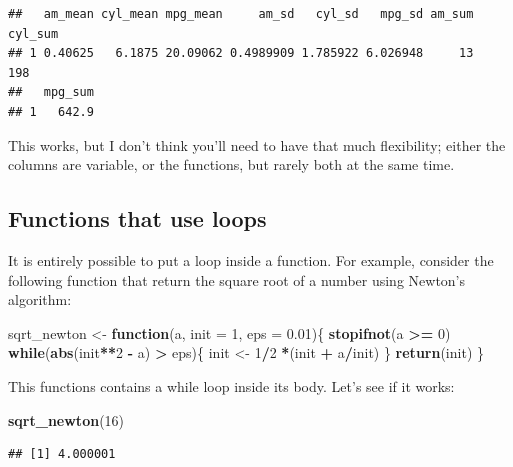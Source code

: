 \documentclass[]{gitbook}
\newenvironment{Shaded}{\begin{snugshade}}{\end{snugshade}}
\newcommand{\ControlFlowTok}[1]{\textcolor[rgb]{0.13,0.29,0.53}{\textbf{#1}}}
\newcommand{\DataTypeTok}[1]{\textcolor[rgb]{0.13,0.29,0.53}{#1}}
\newcommand{\DecValTok}[1]{\textcolor[rgb]{0.00,0.00,0.81}{#1}}
\newcommand{\FloatTok}[1]{\textcolor[rgb]{0.00,0.00,0.81}{#1}}
\newcommand{\KeywordTok}[1]{\textcolor[rgb]{0.13,0.29,0.53}{\textbf{#1}}}
\newcommand{\NormalTok}[1]{#1}
\newcommand{\OperatorTok}[1]{\textcolor[rgb]{0.81,0.36,0.00}{\textbf{#1}}}
\newcommand{\StringTok}[1]{\textcolor[rgb]{0.31,0.60,0.02}{#1}}
\theoremstyle{definition}
\theoremstyle{definition}
\theoremstyle{definition}
\theoremstyle{remark}
\begin{document}
\begin{verbatim}
##   am_mean cyl_mean mpg_mean     am_sd   cyl_sd   mpg_sd am_sum cyl_sum
## 1 0.40625   6.1875 20.09062 0.4989909 1.785922 6.026948     13     198
##   mpg_sum
## 1   642.9
\end{verbatim}

This works, but I don't think you'll need to have that much flexibility;
either the columns are variable, or the functions, but rarely both at
the same time.

\hypertarget{functions-that-use-loops}{%
\subsection{Functions that use loops}\label{functions-that-use-loops}}

It is entirely possible to put a loop inside a function. For example,
consider the following function that return the square root of a number
using Newton's algorithm:

\begin{Shaded}
\begin{Highlighting}[]
\NormalTok{sqrt_newton <-}\StringTok{ }\ControlFlowTok{function}\NormalTok{(a, }\DataTypeTok{init =} \DecValTok{1}\NormalTok{, }\DataTypeTok{eps =} \FloatTok{0.01}\NormalTok{)\{}
    \KeywordTok{stopifnot}\NormalTok{(a }\OperatorTok{>=}\StringTok{ }\DecValTok{0}\NormalTok{)}
    \ControlFlowTok{while}\NormalTok{(}\KeywordTok{abs}\NormalTok{(init}\OperatorTok{**}\DecValTok{2} \OperatorTok{-}\StringTok{ }\NormalTok{a) }\OperatorTok{>}\StringTok{ }\NormalTok{eps)\{}
\NormalTok{        init <-}\StringTok{ }\DecValTok{1}\OperatorTok{/}\DecValTok{2} \OperatorTok{*}\NormalTok{(init }\OperatorTok{+}\StringTok{ }\NormalTok{a}\OperatorTok{/}\NormalTok{init)}
\NormalTok{    \}}
    \KeywordTok{return}\NormalTok{(init)}
\NormalTok{\}}
\end{Highlighting}
\end{Shaded}

This functions contains a while loop inside its body. Let's see if it
works:

\begin{Shaded}
\begin{Highlighting}[]
\KeywordTok{sqrt_newton}\NormalTok{(}\DecValTok{16}\NormalTok{)}
\end{Highlighting}
\end{Shaded}

\begin{verbatim}
## [1] 4.000001
\end{verbatim}
\end{document}
